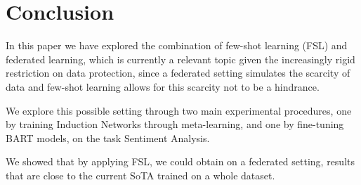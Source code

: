 \documentclass{esannV2}
\begin{document}
    




    \section{Conclusion}
    In this paper we have explored the combination of few-shot learning (FSL) and federated learning, which is currently a relevant topic given the increasingly rigid restriction on data protection, since a federated setting simulates the scarcity of data and few-shot learning allows for this scarcity not to be a hindrance.
    
    We explore this possible setting through two main experimental procedures, one by training Induction Networks through meta-learning, and one by fine-tuning BART models, on the task Sentiment Analysis.
    
    We showed that by applying FSL, we could obtain on a federated setting, results that are close to the current SoTA trained on a whole dataset. 

\begin{footnotesize}
 
 
\end{footnotesize}

%
\end{document}
